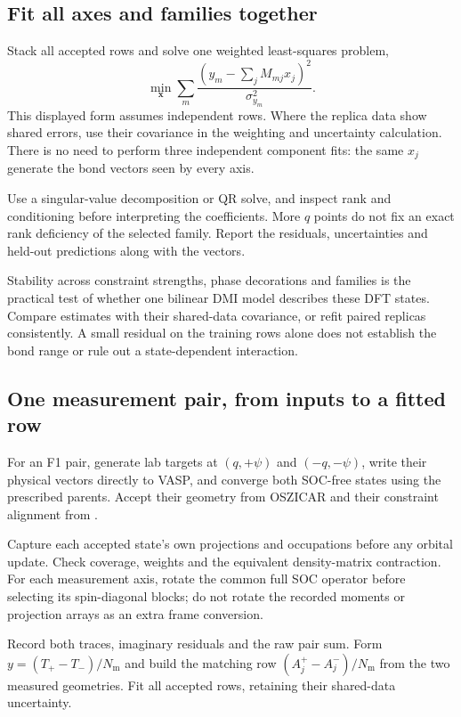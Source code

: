 \documentclass[11pt,a4paper]{article}
\numberwithin{equation}{section}
\newcommand{\vct}[1]{\bm{#1}}
\newcommand{\Nm}{N_{\mathrm m}}
\newcommand{\code}[1]{\texttt{\detokenize{#1}}}
\begin{document}
\subsection{Fit all axes and families together}

Stack all accepted rows and solve one weighted least-squares problem,
\begin{equation}\label{eq:fit}
 \min_{\vct x}\sum_m
 \frac{(y_m-\sum_jM_{mj}x_j)^2}{\sigma_{y_m}^2}.
\end{equation}
This displayed form assumes independent rows. Where the replica data show
shared errors, use their covariance in the weighting and uncertainty
calculation. There is no need to perform three independent component fits:
the same $x_j$ generate the bond vectors seen by every axis.

Use a singular-value decomposition or QR solve, and inspect rank and
conditioning before interpreting the coefficients. More $q$ points do not
fix an exact rank deficiency of the selected family. Report the residuals,
uncertainties and held-out predictions along with the vectors.

Stability across constraint strengths, phase decorations and families is
the practical test of whether one bilinear DMI model describes these DFT
states. Compare estimates with their shared-data covariance, or refit
paired replicas consistently. A small residual on the training rows alone
does not establish the bond range or rule out a state-dependent interaction.

\subsection{One measurement pair, from inputs to a fitted row}

For an F1 pair, generate lab targets at $(q,+\psi)$ and $(-q,-\psi)$,
write their physical vectors directly to VASP, and converge both SOC-free
states using the prescribed parents. Accept their geometry from OSZICAR
\code{M_int} and their constraint alignment from \code{MW_int}.

Capture each accepted state's own projections and occupations before any
orbital update. Check coverage, weights and the equivalent density-matrix
contraction. For each measurement axis, rotate the common full SOC operator
before selecting its spin-diagonal blocks; do not rotate the recorded
moments or projection arrays as an extra frame conversion.

Record both traces, imaginary residuals and the raw pair sum. Form
$y=(T_+-T_-)/\Nm$ and build the matching row
$(A_j^+-A_j^-)/\Nm$ from the two measured geometries.
Fit all accepted rows, retaining their shared-data uncertainty.
\end{document}
